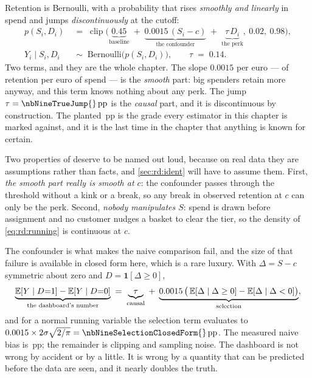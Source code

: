 Retention is Bernoulli, with a probability that rises \emph{smoothly and linearly} in spend and
jumps \emph{discontinuously} at the cutoff:
%
\begin{align}
  p(S_i, D_i) &\;=\; \operatorname{clip}\!\Big(
      \underbrace{0.45}_{\text{baseline}}
      \;+\; \underbrace{0.0015\,(S_i - c)}_{\text{the confounder}}
      \;+\; \underbrace{\tau\, D_i}_{\text{the perk}} ,\ 0.02,\ 0.98 \Big),
      \label{eq:rd:p}\\[2pt]
  Y_i \mid S_i, D_i &\;\sim\; \text{Bernoulli}\big(p(S_i, D_i)\big),
  \qquad \tau \;=\; 0.14 .
      \label{eq:rd:y}
\end{align}
%
Two terms, and they are the whole chapter. The slope $0.0015$ per euro ---  of retention
per euro of spend --- is the \emph{smooth} part: big spenders retain more anyway, and this term
knows nothing about any perk. The jump $\tau = \nbNineTrueJump{}\,\text{pp}$ is the \emph{causal}
part, and it is discontinuous by construction. The planted \nbNineTrueJump{}\,pp is the grade every
estimator in this chapter is marked against, and it is the last time in the chapter that anything
is known for certain.

Two properties of  deserve to be named out loud, because on real
data they are assumptions rather than facts, and \cref{sec:rd:ident} will have to assume them.
First, \emph{the smooth part really is smooth at $c$}: the confounder passes through the threshold
without a kink or a break, so any break in observed retention at $c$ can only be the perk. Second,
\emph{nobody manipulates $S$}: spend is drawn before assignment and no customer nudges a basket to
clear the tier, so the density of \cref{eq:rd:running} is continuous at $c$.

The confounder is what makes the naive comparison fail, and the size of that failure is available
in closed form here, which is a rare luxury. With $\Delta = S - c$ symmetric about zero and
$D = \mathbf 1[\Delta \ge 0]$,
%
\begin{equation}
  \underbrace{\operatorname{\mathbb{E}}[Y \mid D{=}1] - \operatorname{\mathbb{E}}[Y \mid D{=}0]}_{\text{the dashboard's number}}
  \;=\; \underbrace{\tau}_{\text{causal}}
  \;+\; \underbrace{0.0015\,\big(\operatorname{\mathbb{E}}[\Delta \mid \Delta \ge 0] - \operatorname{\mathbb{E}}[\Delta \mid \Delta < 0]\big)}
        _{\text{selection}} ,
  \label{eq:rd:decomp}
\end{equation}
%
and for a normal running variable the selection term evaluates to
$0.0015 \times 2\sigma\sqrt{2/\pi} = \nbNineSelectionClosedForm{}\,\text{pp}$. The measured
naive bias is \nbNineNaiveBias{}\,pp; the remainder is clipping and sampling noise. The dashboard is
not wrong by accident or by a little. It is wrong by a quantity that can be predicted before the
data are seen, and it nearly doubles the truth.

